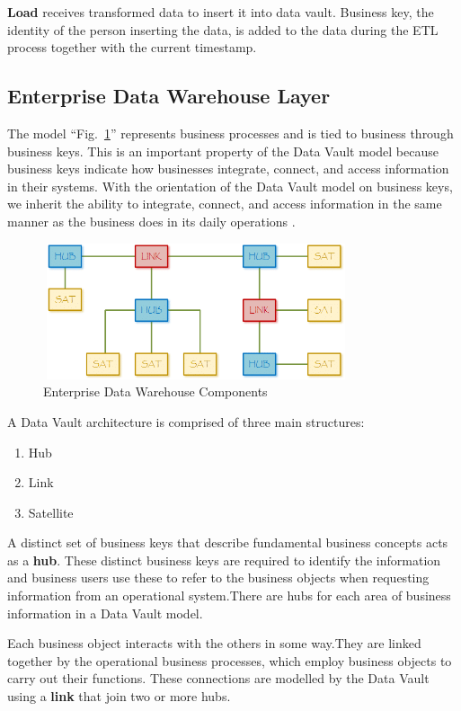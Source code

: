 \documentclass[conference]{IEEEtran}
\begin{document}
\textbf{Load} receives transformed data to insert it into data vault. Business key, the identity of the person inserting the data, is added to the data during the ETL process together with the current timestamp.

\subsection{Enterprise Data Warehouse Layer}

The model ``Fig.~\ref{fig2}'' represents business processes and is tied to business through business keys. This is an important property of the Data Vault model because business keys indicate how businesses integrate, connect, and access information in their systems. With the orientation of the Data Vault model on business keys, we inherit the ability to integrate, connect, and access information in the same manner as the business does in its daily operations \cite{b2}.

\begin{figure}[htbp]
\centerline{\includegraphics[width=9cm, height=4cm]{Figure2.png}}
\caption{Enterprise Data Warehouse Components}
\label{fig2}
\end{figure}

\smallskip
\noindent A Data Vault architecture is comprised of three main structures:

\begin{enumerate}
\item Hub
\item Link
\item Satellite
\end{enumerate}

A distinct set of business keys that describe fundamental business concepts acts as a \textbf{hub}. These distinct business keys are required to identify the information and business users use these to refer to the business objects when requesting information from an operational system.There are hubs for each area of business information in a Data Vault model.

Each business object interacts with the others in some way.They are linked together by the operational business processes, which employ business objects to carry out their functions. These connections are modelled by the Data Vault using a \textbf{link} that join two or more hubs.
\end{document}
